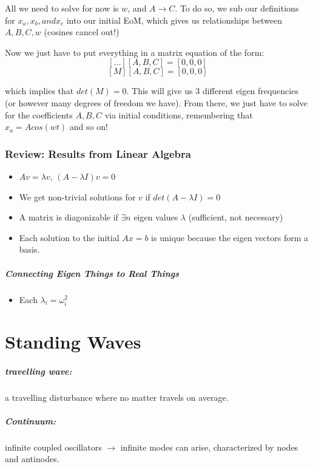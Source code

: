 \documentclass[a4paper,12pt]{report}
\begin{document}
All we need to solve for now is $w$, and $A \to C$. To do so, we sub our definitions for $x_a, x_b, and x_c$ 
into our initial EoM, which gives us relationships between $A, B, C, w$ (cosines cancel out!)

Now we just have to put everything in a matrix equation of the form:
$$[...][A, B, C] = [0, 0, 0]$$
$$[M][A, B, C] = [0, 0, 0]$$

which implies that $det(M) = 0$. This will give us $3$ different eigen frequencies (or however many degrees 
of freedom we have). From there, we just have to solve for the coefficients $A, B, C$ via initial conditions, 
remembering that $x_a = Acos(wt)$ and so on!

\subsection{Review: Results from Linear Algebra}
\begin{itemize}
\item $Av = \lambda v$, $(A-\lambda I)v = 0$
\item We get non-trivial solutions for $v$ if $det(A - \lambda I) = 0$
\item A matrix is diagonizable if $\exists n$ eigen values $\lambda$ (sufficient, not necessary)
\item Each solution to the initial $Ax = b$ is unique because the eigen vectors form a basis.
\end{itemize}

\paragraph{Connecting Eigen Things to Real Things}
\begin{itemize}
\item Each $\lambda_i = \omega_i^2$
\end{itemize}

\chapter{Standing Waves}
\paragraph{travelling wave: } a travelling disturbance where no matter travels on average.
\paragraph{Continuum: } infinite coupled oscillators $\to$ infinite modes can arise, characterized 
by nodes and antinodes.
\end{document}
